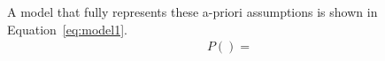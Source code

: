 A model that fully represents these a-priori assumptions is shown in Equation~\ref{eq:model1}.
\begin{align}
    P() = 
\end{align}
